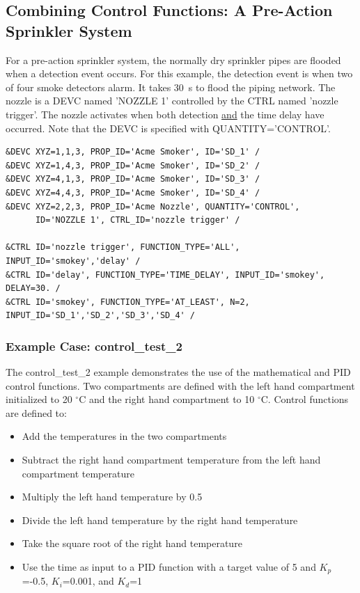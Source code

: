 \documentclass[11pt]{book}
\begin{document}
\subsection{Combining Control Functions: A Pre-Action Sprinkler System}

For a pre-action sprinkler system, the normally
dry sprinkler pipes are flooded when a detection event occurs. For this example, the detection event is
when two of four smoke detectors alarm.  It takes 30~s to flood the piping network.
The nozzle is a {\ct DEVC} named {\ct 'NOZZLE 1'} controlled by the {\ct CTRL} named {\ct 'nozzle trigger'}.
The nozzle activates when both detection \underline{and} the time delay have occurred.  Note that the {\ct DEVC} is
specified with {\ct QUANTITY='CONTROL'}.

\begin{lstlisting}
&DEVC XYZ=1,1,3, PROP_ID='Acme Smoker', ID='SD_1' /
&DEVC XYZ=1,4,3, PROP_ID='Acme Smoker', ID='SD_2' /
&DEVC XYZ=4,1,3, PROP_ID='Acme Smoker', ID='SD_3' /
&DEVC XYZ=4,4,3, PROP_ID='Acme Smoker', ID='SD_4' /
&DEVC XYZ=2,2,3, PROP_ID='Acme Nozzle', QUANTITY='CONTROL',
      ID='NOZZLE 1', CTRL_ID='nozzle trigger' /

&CTRL ID='nozzle trigger', FUNCTION_TYPE='ALL', INPUT_ID='smokey','delay' /
&CTRL ID='delay', FUNCTION_TYPE='TIME_DELAY', INPUT_ID='smokey', DELAY=30. /
&CTRL ID='smokey', FUNCTION_TYPE='AT_LEAST', N=2, INPUT_ID='SD_1','SD_2','SD_3','SD_4' /
\end{lstlisting}

\subsubsection{Example Case: control\_test\_2 }
\label{control_test_2}

The {\ct control\_test\_2} example demonstrates the use of the mathematical and PID control functions.  Two compartments are defined with the left hand compartment initialized to 20 $^\circ$C and the right hand compartment to 10 $^\circ$C.    Control functions are defined to:

\begin{itemize}
\item Add the temperatures in the two compartments
\item Subtract the right hand compartment temperature from the left hand compartment temperature
\item Multiply the left hand temperature by 0.5
\item Divide the left hand temperature by the right hand temperature
\item Take the square root of the right hand temperature
\item Use the time as input to a PID function with a target value of 5 and $K_p$=-0.5, $K_i$=0.001, and $K_d$=1
\end{itemize}
\end{document}
